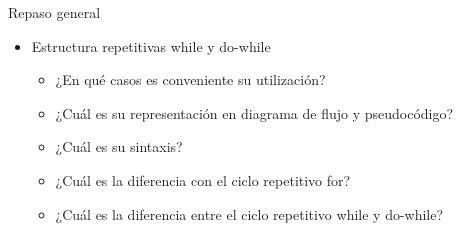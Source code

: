 \documentclass[xcolor=pdftex,table,11pt]{beamer}
\begin{document}
\begin{frame}[allowframebreaks]{Repaso general}
\begin{itemize}
			\item Estructura repetitivas while y do-while
		\begin{itemize}
		\item  ¿En qué casos es conveniente su utilización?
	    \item  ¿Cuál es su representación en diagrama de flujo y pseudocódigo?
		\item  ¿Cuál es su sintaxis?
		\item  ¿Cuál es la diferencia con el ciclo repetitivo for?
		\item  ¿Cuál es la diferencia entre el ciclo repetitivo while y do-while?
	\end{itemize}
	
\end{itemize}
\end{frame}
\end{document}
